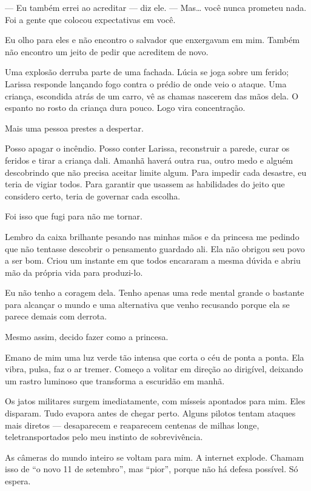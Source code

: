 — Eu também errei ao acreditar — diz ele. — Mas… você nunca prometeu nada. Foi a gente que colocou expectativas em você.

Eu olho para eles e não encontro o salvador que enxergavam em mim. Também não encontro um jeito de pedir que acreditem de novo.

\bigskip

Uma explosão derruba parte de uma fachada. Lúcia se joga sobre um ferido; Larissa responde lançando fogo contra o prédio de onde veio o ataque. Uma criança, escondida atrás de um carro, vê as chamas nascerem das mãos dela. O espanto no rosto da criança dura pouco. Logo vira concentração.

Mais uma pessoa prestes a despertar.

Posso apagar o incêndio. Posso conter Larissa, reconstruir a parede, curar os feridos e tirar a criança dali. Amanhã haverá outra rua, outro medo e alguém descobrindo que não precisa aceitar limite algum. Para impedir cada desastre, eu teria de vigiar todos. Para garantir que usassem as habilidades do jeito que considero certo, teria de governar cada escolha.

Foi isso que fugi para não me tornar.

Lembro da caixa brilhante pesando nas minhas mãos e da princesa me pedindo que não tentasse descobrir o pensamento guardado ali. Ela não obrigou seu povo a ser bom. Criou um instante em que todos encararam a mesma dúvida e abriu mão da própria vida para produzi-lo.

Eu não tenho a coragem dela. Tenho apenas uma rede mental grande o bastante para alcançar o mundo e uma alternativa que venho recusando porque ela se parece demais com derrota.

Mesmo assim, decido fazer como a princesa.

\bigskip

Emano de mim uma luz verde tão intensa que corta o céu de ponta a ponta. Ela vibra, pulsa, faz o ar tremer. Começo a volitar em direção ao dirigível, deixando um rastro luminoso que transforma a escuridão em manhã.

Os jatos militares surgem imediatamente, com mísseis apontados para mim. Eles disparam. Tudo evapora antes de chegar perto. Alguns pilotos tentam ataques mais diretos — desaparecem e reaparecem centenas de milhas longe, teletransportados pelo meu instinto de sobrevivência.

As câmeras do mundo inteiro se voltam para mim. A internet explode. Chamam isso de “o novo 11 de setembro”, mas “pior”, porque não há defesa possível. Só espera.

